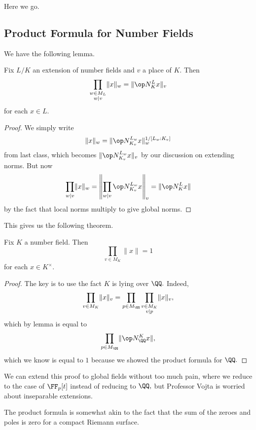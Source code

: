 \documentclass[../notes.tex]{subfiles}
\begin{document}














Here we go.

\subsection{Product Formula for Number Fields}
We have the following lemma.
\begin{lemma}
	Fix $L/K$ an extension of number fields and $v$ a place of $K.$ Then
	\[\prod_{\substack{w\in M_L\\w\mid v}}\lVert x\rVert_w=\lVert\op N_K^Lx\rVert_v\]
	for each $x\in L.$
\end{lemma}
\begin{proof}
	We simply write
	\[\lVert x\rVert_w=\lVert\op N_{K_v}^{L_w}x\rVert_w^{1/[L_w:K_v]}\]
	from last class, which becomes $\lVert\op N_{K_v}^{L_w}x\rVert_v$ by our discussion on extending norms. But now
	\[\prod_{w\mid v}\lVert x\rVert_w=\left\lVert\prod_{w\mid v}\op N_{K_v}^{L_w}x\right\rVert_v=\lVert\op N_K^Lx\rVert\]
	by the fact that local norms multiply to give global norms.
\end{proof}
This gives us the following theorem.
\begin{theorem}
	Fix $K$ a number field. Then
	\[\prod_{v\in M_K}\lVert x\rVert=1\]
	for each $x\in K^\times.$
\end{theorem}
\begin{proof}
	The key is to use the fact $K$ is lying over $\QQ.$ Indeed,
	\[\prod_{v\in M_K}\lVert x\rVert_v=\prod_{p\in M_\QQ}\prod_{\substack{v\in M_K\\v\mid p}}\lVert x\rVert_v,\]
	which by lemma is equal to
	\[\prod_{p\in M_\QQ}\lVert\op N_\QQ^Kx\rVert,\]
	which we know is equal to $1$ because we showed the product formula for $\QQ.$
\end{proof}
\begin{remark}
	We can extend this proof to global fields without too much pain, where we reduce to the case of $\FF_p[t]$ instead of reducing to $\QQ,$ but Professor Vojta is worried about inseparable extensions.
\end{remark}
\begin{remark}
	The product formula is somewhat akin to the fact that the sum of the zeroes and poles is zero for a compact Riemann surface.
\end{remark}
\end{document}
